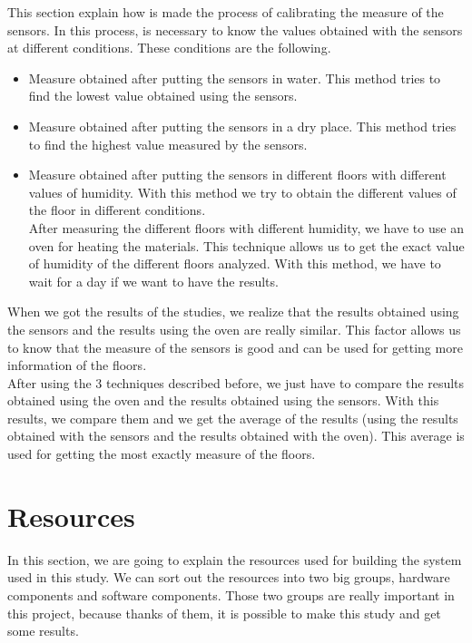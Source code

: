 This section explain how is made the process of calibrating the measure of the sensors. In this process, is necessary to know the values obtained with the sensors at different conditions. These conditions are the following.

\begin{itemize}

\item Measure obtained after putting the sensors in water. This method tries to find the lowest value obtained using the sensors.

\item Measure obtained after putting the sensors in a dry place. This method tries to find the highest value measured by the sensors.

\item Measure obtained after putting the sensors in different floors with different values of humidity. With this method we try to obtain the different values of the floor in different conditions.\\

After measuring the different floors with different humidity, we have to use an oven for heating the materials. This technique allows us to get the exact value of humidity of the different floors analyzed. With this method, we have to wait for a day if we want to have the results.

\end{itemize}

When we got the results of the studies, we realize that the results obtained using the sensors and the results using the oven are really similar. This factor allows us to know that the measure of the sensors is good and can be used for getting more information of the floors.\\

After using the 3 techniques described before, we just have to compare the results obtained using the oven and the results obtained using the sensors. With this results, we compare them and we get the average of the results (using the results obtained with the sensors and the results obtained with the oven). This average is used for getting the most exactly measure of the floors.

\section{Resources}

In this section, we are going to explain the resources used for building the system used in this study. We can sort out the resources into two big groups, hardware components and software components. Those two groups are really important in this project, because thanks of them, it is possible to make this study and get some results.

